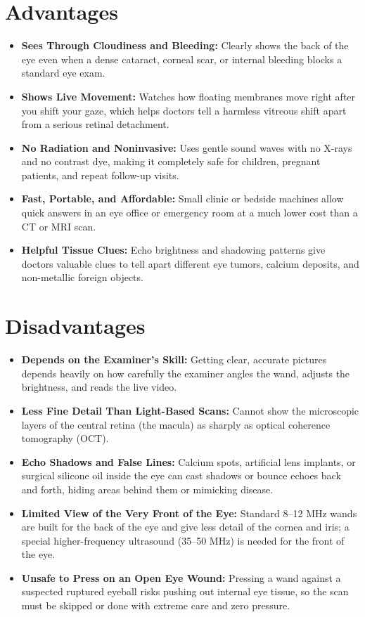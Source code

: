 \section{Advantages}
\begin{itemize}
    \item \textbf{Sees Through Cloudiness and Bleeding:} Clearly shows the back of the eye even when a dense cataract, corneal scar, or internal bleeding blocks a standard eye exam.
    \item \textbf{Shows Live Movement:} Watches how floating membranes move right after you shift your gaze, which helps doctors tell a harmless vitreous shift apart from a serious retinal detachment.
    \item \textbf{No Radiation and Noninvasive:} Uses gentle sound waves with no X-rays and no contrast dye, making it completely safe for children, pregnant patients, and repeat follow-up visits.
    \item \textbf{Fast, Portable, and Affordable:} Small clinic or bedside machines allow quick answers in an eye office or emergency room at a much lower cost than a CT or MRI scan.
    \item \textbf{Helpful Tissue Clues:} Echo brightness and shadowing patterns give doctors valuable clues to tell apart different eye tumors, calcium deposits, and non-metallic foreign objects.
\end{itemize}

\section{Disadvantages}
\begin{itemize}
    \item \textbf{Depends on the Examiner's Skill:} Getting clear, accurate pictures depends heavily on how carefully the examiner angles the wand, adjusts the brightness, and reads the live video.
    \item \textbf{Less Fine Detail Than Light-Based Scans:} Cannot show the microscopic layers of the central retina (the macula) as sharply as optical coherence tomography (OCT).
    \item \textbf{Echo Shadows and False Lines:} Calcium spots, artificial lens implants, or surgical silicone oil inside the eye can cast shadows or bounce echoes back and forth, hiding areas behind them or mimicking disease.
    \item \textbf{Limited View of the Very Front of the Eye:} Standard 8--12 MHz wands are built for the back of the eye and give less detail of the cornea and iris; a special higher-frequency ultrasound (35--50 MHz) is needed for the front of the eye.
    \item \textbf{Unsafe to Press on an Open Eye Wound:} Pressing a wand against a suspected ruptured eyeball risks pushing out internal eye tissue, so the scan must be skipped or done with extreme care and zero pressure.
\end{itemize}

